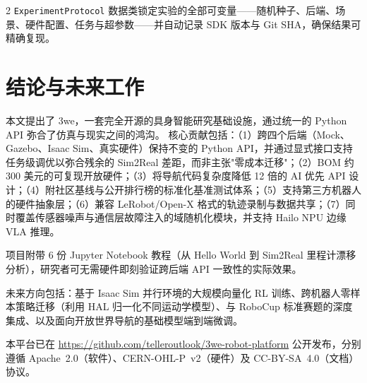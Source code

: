 \documentclass[UTF8]{ctexart}
\begin{document}
\begin{multicols}{2}
\texttt{ExperimentProtocol} 数据类锁定实验的全部可变量——随机种子、后端、场景、硬件配置、任务与超参数——并自动记录 SDK 版本与 Git SHA，确保结果可精确复现。

\section{结论与未来工作}

本文提出了 3we，一套完全开源的具身智能研究基础设施，通过统一的 Python API 弥合了仿真与现实之间的鸿沟。
核心贡献包括：（1）跨四个后端（Mock、Gazebo、Isaac Sim、真实硬件）保持不变的 Python API，并通过显式接口支持任务级调优以弥合残余的 Sim2Real 差距，而非主张"零成本迁移"；（2）BOM 约 300 美元的可复现开放硬件；（3）将导航代码复杂度降低 12 倍的 AI 优先 API 设计；（4）附社区基线与公开排行榜的标准化基准测试体系；（5）支持第三方机器人的硬件抽象层；（6）兼容 LeRobot/Open-X 格式的轨迹录制与数据共享；（7）同时覆盖传感器噪声与通信层故障注入的域随机化模块，并支持 Hailo NPU 边缘 VLA 推理。

项目附带 6 份 Jupyter Notebook 教程（从 Hello World 到 Sim2Real 里程计漂移分析），研究者可无需硬件即刻验证跨后端 API 一致性的实际效果。

未来方向包括：基于 Isaac Sim 并行环境的大规模向量化 RL 训练、跨机器人零样本策略迁移（利用 HAL 归一化不同运动学模型）、与 RoboCup 标准赛题的深度集成、以及面向开放世界导航的基础模型端到端微调。

本平台已在 \url{https://github.com/telleroutlook/3we-robot-platform} 公开发布，分别遵循 Apache~2.0（软件）、CERN-OHL-P~v2（硬件）及 CC-BY-SA~4.0（文档）协议。

\end{multicols}



\end{document}
